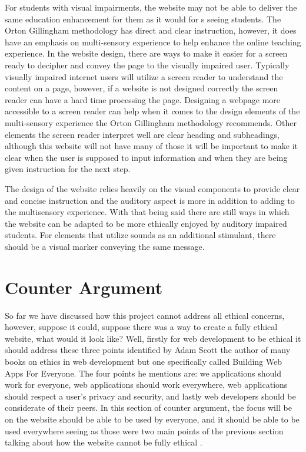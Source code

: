\documentclass[10pt,twocolumn]{article}
\begin{document}
For students with visual impairments, the website may not be able to deliver the same education enhancement for them as it would for s seeing students. The Orton Gillingham methodology has direct and clear instruction, however, it does have an emphasis on multi-sensory experience to help enhance the online teaching experience. In the website design, there are ways to make it easier for a screen ready to decipher and convey the page to the visually impaired user. Typically visually impaired internet users will utilize a screen reader to understand the content on a page, however, if a website is not designed correctly the screen reader can have a hard time processing the page. Designing a webpage more accessible to a screen reader can help when it comes to the design elements of the multi-sensory experience the Orton Gillingham methodology recommends. Other elements the screen reader interpret well are clear heading and subheadings, although this website will not have many of those it will be important to make it clear when the user is supposed to input information and when they are being given instruction for the next step. \cite{noauthor_is_nodate}

The design of the website relies heavily on the visual components to provide clear and concise instruction and the auditory aspect is more in addition to adding to the multisensory experience. With that being said there are still ways in which the website can be adapted to be more ethically enjoyed by auditory impaired students. For elements that utilize sounds as an additional stimulant, there should be a visual marker conveying the same message. 


\section{Counter Argument}
So far we have discussed how this project cannot address all ethical concerns, however, suppose it could, suppose there was a way to create a fully ethical website, what would it look like? Well, firstly for web development to be ethical it should address these three points identified by Adam Scott the author of many books on ethics in web development but one specifically called Building Web Apps For Everyone. The four points he mentions are: we applications should work for everyone, web applications should work everywhere, web applications should respect a user’s privacy and security, and lastly web developers should be considerate of their peers. In this section of counter argument, the focus will be on the website should be able to be used by everyone, and it should be able to be used everywhere seeing as those were two main points of the previous section talking about how the website cannot be fully ethical .\cite{scott_ethical_nodate}
\end{document}
